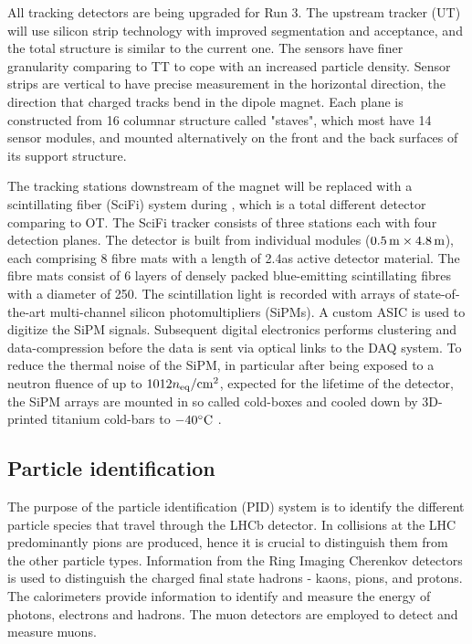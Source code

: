 All tracking detectors are being upgraded for Run 3. 
The upstream tracker (UT) will use silicon strip technology with improved segmentation and acceptance,
and the total structure is similar to the current one.
The sensors have finer granularity comparing to TT to cope with an increased particle density. 
Sensor strips are vertical to have precise measurement in the horizontal direction,
the direction that charged tracks bend in the dipole magnet.
Each plane is constructed from 16 columnar structure called "staves",
which most have 14 sensor modules,
and mounted alternatively on the front and the back surfaces of its support structure\supercite{LHCb-TDR-015,Proceedings:2015ihx,Rudolph:2020zeq}.

The tracking stations downstream of the magnet will be replaced with a scintillating fiber (SciFi) system during \upgradeone,
which is a total different detector comparing to OT.
The SciFi tracker consists of three stations each with four detection planes. 
The detector is built from individual modules ($0.5\text{\,m}\times4.8\text{\,m}$), 
each comprising 8 fibre mats with a length of 2.4\m as active detector material. 
The fibre mats consist of 6 layers of densely packed blue-emitting scintillating fibres with a diameter of 250\mum. 
The scintillation light is recorded with arrays of state-of-the-art multi-channel silicon photomultipliers (SiPMs). 
A custom ASIC is used to digitize the SiPM signals. 
Subsequent digital electronics performs clustering and data-compression before the data is sent via optical links to the DAQ system. 
To reduce the thermal noise of the SiPM, 
in particular after being exposed to a neutron fluence of up to $1012n_{\text{eq}}/\text{cm}^2$, 
expected for the lifetime of the detector, 
the SiPM arrays are mounted in so called cold-boxes and cooled down by 3D-printed titanium cold-bars to $-40^\circ{\text{C}}$
\supercite{LHCb-TDR-015,Massafferri:2020dbk}.



\subsection{Particle identification}

The purpose of the particle identification (PID) system is to identify the different particle species that travel through the LHCb detector. 
In \proton\proton collisions at the LHC predominantly pions are produced, 
hence it is crucial to distinguish them from the other particle types. 
Information from the Ring Imaging Cherenkov detectors is used to distinguish the charged final state hadrons - kaons, pions, and protons. 
The calorimeters provide information to identify and measure the energy of photons, electrons and hadrons.
The muon detectors are employed to detect and measure muons.


